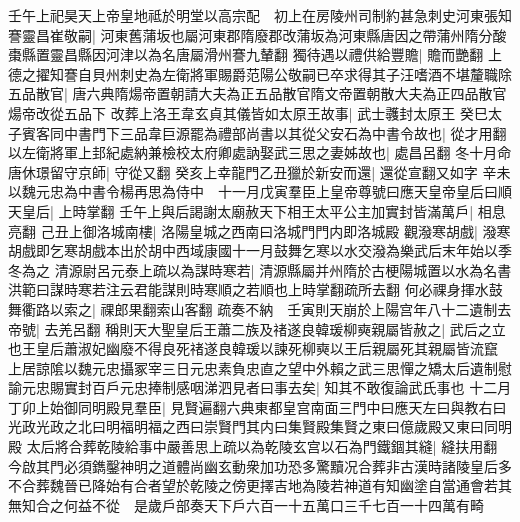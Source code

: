 壬午上祀昊天上帝皇地祗於明堂以高宗配　初上在房陵州司制約甚急刺史河東張知謇靈昌崔敬嗣|{
	河東舊蒲坂也屬河東郡隋廢郡改蒲坂為河東縣唐因之帶蒲州隋分酸棗縣置靈昌縣因河津以為名唐屬滑州謇九輦翻}
獨待遇以禮供給豐贍|{
	贍而艷翻}
上德之擢知謇自貝州刺史為左衛將軍賜爵范陽公敬嗣已卒求得其子汪嗜酒不堪釐職除五品散官|{
	唐六典隋煬帝置朝請大夫為正五品散官隋文帝置朝散大夫為正四品散官煬帝改從五品下}
改葬上洛王韋玄貞其儀皆如太原王故事|{
	武士彠封太原王}
癸巳太子賓客同中書門下三品韋巨源罷為禮部尚書以其從父安石為中書令故也|{
	從才用翻}
以左衛將軍上邽紀處納兼檢校太府卿處訥娶武三思之妻姊故也|{
	處昌呂翻}
冬十月命唐休璟留守京師|{
	守從又翻}
癸亥上幸龍門乙丑獵於新安而還|{
	還從宣翻又如字}
辛未以魏元忠為中書令楊再思為侍中　十一月戊寅羣臣上皇帝尊號曰應天皇帝皇后曰順天皇后|{
	上時掌翻}
壬午上與后謁謝太廟赦天下相王太平公主加實封皆滿萬戶|{
	相息亮翻}
己丑上御洛城南樓|{
	洛陽皇城之西南曰洛城門門内即洛城殿}
觀潑寒胡戲|{
	潑寒胡戲即乞寒胡戲本出於胡中西域康國十一月鼓舞乞寒以水交潑為樂武后末年始以季冬為之}
清源尉呂元泰上疏以為謀時寒若|{
	清源縣屬并州隋於古梗陽城置以水為名書洪範曰謀時寒若注云君能謀則時寒順之若順也上時掌翻疏所去翻}
何必祼身揮水鼓舞衢路以索之|{
	祼郎果翻索山客翻}
疏奏不納　壬寅則天崩於上陽宫年八十二遺制去帝號|{
	去羌呂翻}
稱則天大聖皇后王蕭二族及禇遂良韓瑗柳奭親屬皆赦之|{
	武后之立也王皇后蕭淑妃幽廢不得良死禇遂良韓瑗以諫死柳奭以王后親屬死其親屬皆流竄}
上居諒隂以魏元忠攝冢宰三日元忠素負忠直之望中外賴之武三思憚之矯太后遺制慰諭元忠賜實封百戶元忠捧制感咽涕泗見者曰事去矣|{
	知其不敢復論武氏事也}
十二月丁卯上始御同明殿見羣臣|{
	見賢遍翻六典東都皇宫南面三門中曰應天左曰與教右曰光政光政之北曰明福明福之西曰崇賢門其内曰集賢殿集賢之東曰億歲殿又東曰同明殿}
太后將合葬乾陵給事中嚴善思上疏以為乾陵玄宫以石為門鐵錮其縫|{
	縫扶用翻}
今啟其門必須鐫鑿神明之道體尚幽玄動衆加功恐多驚黷况合葬非古漢時諸陵皇后多不合葬魏晉已降始有合者望於乾陵之傍更擇吉地為陵若神道有知幽塗自當通會若其無知合之何益不從　是歲戶部奏天下戶六百一十五萬口三千七百一十四萬有畸

